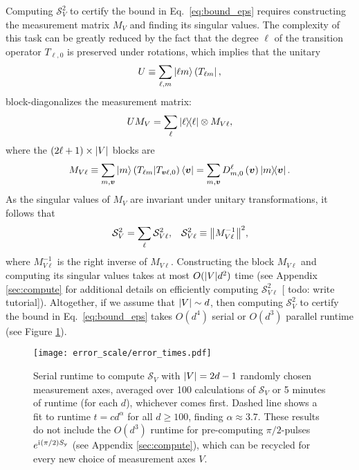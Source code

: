 \documentclass[notitlepage,twocolumn]{revtex4-2}
\newcommand{\p}[1]{\left(#1\right)} %
\renewcommand{\v}{\bm} %
\renewcommand{\i}{\mathrm{i}\mkern1mu} %
\newcommand{\y}{\text{y}}
\renewcommand{\S}{\mathcal{S}}
\def\obra#1{\mathinner{({#1}|}}
\def\obk#1{\mathinner{({#1})}}
\newcommand{\red}[1]{{\color{red} #1}}
\begin{document}
Computing $\S_V^2$ to certify the bound in Eq.~\eqref{eq:bound_eps} requires constructing the measurement matrix $M_V$ and finding its singular values.
The complexity of this task can be greatly reduced by the fact that the degree $\ell$ of the transition operator $T_{\ell,0}$ is preserved under rotations, which implies that the unitary
\begin{align}
  U \equiv \sum_{\ell,m} \ket{\ell m} \obra{T_{\ell m}},
\end{align}
block-diagonalizes the measurement matrix:
\begin{align}
  U M_V = \sum_\ell \op{\ell} \otimes M_{V\ell},
\end{align}
where the $\p{2\ell+1}\times\abs{V}$ blocks are
\begin{align}
  M_{V\ell} \equiv \sum_{m,\v v} \ket{m} \obk{T_{\ell m}|T_{\v v\ell,0}} \bra{\v v}
  = \sum_{m,\v v} D^\ell_{m,0}\p{\v v} \op{m}{\v v}.
\end{align}
As the singular values of $M_V$ are invariant under unitary transformations, it follows that
\begin{align}
  \S_V^2 = \sum_\ell \S_{V\ell}^2,
  &&
  \S_{V\ell}^2 \equiv \norm{M_{V\ell}^{-1}}^2,
\end{align}
where $M_{V\ell}^{-1}$ is the right inverse of $M_{V\ell}$.
Constructing the block $M_{V\ell}$ and computing its singular values takes at most $O(\abs{V}d^2)$ time (see Appendix \ref{sec:compute} for additional details on efficiently computing $\S_{V\ell}^2$ [\red{todo: write tutorial}]).
Altogether, if we assume that $\abs{V}\sim d$, then computing $\S_V^2$ to certify the bound in Eq.~\eqref{eq:bound_eps} takes $O(d^4)$ serial or $O(d^3)$ parallel runtime (see Figure \ref{fig:times}).

\begin{figure}
  \centering
  \texttt{[image: error\_scale/error\_times.pdf]}
  \caption{Serial runtime to compute $\S_V$ with $\abs{V}=2d-1$ randomly chosen measurement axes, averaged over 100 calculations of $\S_V$ or 5 minutes of runtime (for each $d$), whichever comes first.
    Dashed line shows a fit to runtime $t=c d^\alpha$ for all $d\ge100$, finding $\alpha\approx 3.7$.
    These results do not include the $O(d^3)$ runtime for pre-computing $\pi/2$-pulses $e^{\i\p{\pi/2}S_\y}$ (see Appendix \ref{sec:compute}), which can be recycled for every new choice of measurement axes $V$.}
  \label{fig:times}
\end{figure}
\end{document}
